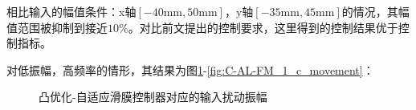 相比输入的幅值条件：x轴$[-40\mathrm{mm}, 50\mathrm{mm}]$，y轴$\left[ -35\mathrm{mm},45\mathrm{mm} \right] $的情况，其幅值范围被抑制到接近$10\%$。对比前文提出的控制要求，这里得到的控制结果优于控制指标。


对低振幅，高频率的情形，其结果为图\ref{fig:C-AL-FM_1_input}-\ref{fig:C-AL-FM_1_c_movement}：

\begin{figure}[H]
    \centering
    \hspace{0.5pt}
    \centering
    \caption[]{凸优化-自适应滑膜控制器对应的输入扰动振幅}
    \label{fig:C-AL-FM_1_input}
\end{figure}

